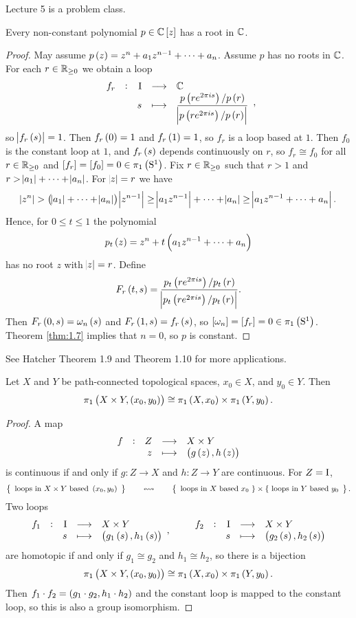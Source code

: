 
Lecture 5 is a problem class.


\begin{theorem}
Every non-constant polynomial $ p \in \CC\sbr{z} $ has a root in $ \mathbb{C} $.
\end{theorem}

\begin{proof}
May assume $ p\br{z} = z^n + a_1z^{n - 1} + \dots + a_n $. Assume $ p $ has no roots in $ \mathbb{C} $. For each $ r \in \mathbb{R}_{\ge 0} $ we obtain a loop
$$ \function[f_r]{\I}{\CC}{s}{\dfrac{p\br{re^{2\pi is}} / p\br{r}}{\abs{p\br{re^{2\pi is}} / p\br{r}}}}, $$
so $ \abs{f_r\br{s}} = 1 $. Then $ f_r\br{0} = 1 $ and $ f_r\br{1} = 1 $, so $ f_r $ is a loop based at $ 1 $. Then $ f_0 $ is the constant loop at $ 1 $, and $ f_r\br{s} $ depends continuously on $ r $, so $ f_r \cong f_0 $ for all $ r \in \mathbb{R}_{\ge 0} $ and $ \sbr{f_r} = \sbr{f_0} = 0 \in \pi_1\br{\S^1} $. Fix $ r \in \mathbb{R}_{\ge 0} $ such that $ r > 1 $ and $ r > \abs{a_1} + \dots + \abs{a_n} $. For $ \abs{z} = r $ we have
$$ \abs{z^n} > \br{\abs{a_1} + \dots + \abs{a_n}}\abs{z^{n - 1}} \ge \abs{a_1z^{n - 1}} + \dots + \abs{a_n} \ge \abs{a_1z^{n - 1} + \dots + a_n}. $$
Hence, for $ 0 \le t \le 1 $ the polynomial
$$ p_t\br{z} = z^n + t\br{a_1z^{n - 1} + \dots + a_n} $$
has no root $ z $ with $ \abs{z} = r $. Define
$$ F_r\br{t, s} = \dfrac{p_t\br{re^{2\pi is}} / p_t\br{r}}{\abs{p_t\br{re^{2\pi is}} / p_t\br{r}}}. $$
Then $ F_r\br{0, s} = \omega_n\br{s} $ and $ F_r\br{1, s} = f_r\br{s} $, so $ \sbr{\omega_n} = \sbr{f_r} = 0 \in \pi_1\br{\S^1} $. Theorem \ref{thm:1.7} implies that $ n = 0 $, so $ p $ is constant.
\end{proof}

See Hatcher Theorem 1.9 and Theorem 1.10 for more applications.

\pagebreak

\begin{proposition}
Let $ X $ and $ Y $ be path-connected topological spaces, $ x_0 \in X $, and $ y_0 \in Y $. Then
$$ \pi_1\br{X \times Y, \br{x_0, y_0}} \cong \pi_1\br{X, x_0} \times \pi_1\br{Y, y_0}. $$
\end{proposition}

\begin{proof}
A map
$$ \function[f]{Z}{X \times Y}{z}{\br{g\br{z}, h\br{z}}} $$
is continuous if and only if $ g : Z \to X $ and $ h : Z \to Y $ are continuous. For $ Z = \mathrm{I} $,
$$ \correspondence{\text{loops in} \ X \times Y \ \text{based} \ \br{x_0, y_0}}{\text{loops in} \ X \ \text{based} \ x_0 \ \} \times \{ \ \text{loops in} \ Y \ \text{based} \ y_0}. $$
Two loops
$$ \function[f_1]{\I}{X \times Y}{s}{\br{g_1\br{s}, h_1\br{s}}}, \qquad \function[f_2]{\I}{X \times Y}{s}{\br{g_2\br{s}, h_2\br{s}}} $$
are homotopic if and only if $ g_1 \cong g_2 $ and $ h_1 \cong h_2 $, so there is a bijection
$$ \pi_1\br{X \times Y, \br{x_0, y_0}} \cong \pi_1\br{X, x_0} \times \pi_1\br{Y, y_0}. $$
Then $ f_1 \cdot f_2 = \br{g_1 \cdot g_2, h_1 \cdot h_2} $ and the constant loop is mapped to the constant loop, so this is also a group isomorphism.
\end{proof}

